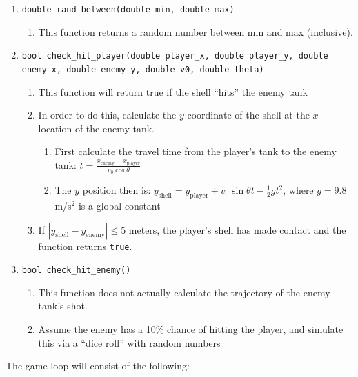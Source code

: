 \documentclass{article}
\begin{document}
\begin{enumerate}
	\item \texttt{double rand\_between(double min, double max)}
	\begin{enumerate}
		\item 	This function returns a random number between min and max (inclusive).
	\end{enumerate}

	\item \texttt{bool check\_hit\_player(double player\_x, double player\_y, double enemy\_x, double enemy\_y, double v0, double theta)}
	\begin{enumerate}
		\item This function will return true if the shell ``hits'' the enemy tank
		\item In order to do this, calculate the $y$ coordinate of the shell at the $x$ location of the enemy tank.
		\begin{enumerate}
			\item First calculate the travel time from the player's tank to the enemy tank: $t=\frac{x_\mathrm{enemy}-x_\mathrm{player}}{v_0\cos{\theta}}$ 
			\item The $y$ position then is: $y_\mathrm{shell}=y_\mathrm{player}+v_0\sin{\theta}t-\frac{1}{2}gt^2$, where $g=9.8$ m/s$^2$ is a global constant
		\end{enumerate}
		\item If $|y_\mathrm{shell}-y_\mathrm{enemy}| \leq 5$ meters, the player's shell has made contact and the function returns \texttt{true}.
	\end{enumerate}
	\item \texttt{bool check\_hit\_enemy()}
	\begin{enumerate}
		\item This function does not actually calculate the trajectory of the enemy tank's shot. 
		\item Assume the enemy has a 10\% chance of hitting the player, and simulate this via a ``dice roll'' with random numbers
	\end{enumerate}
\end{enumerate}
The game loop will consist of the following:
\end{document}
